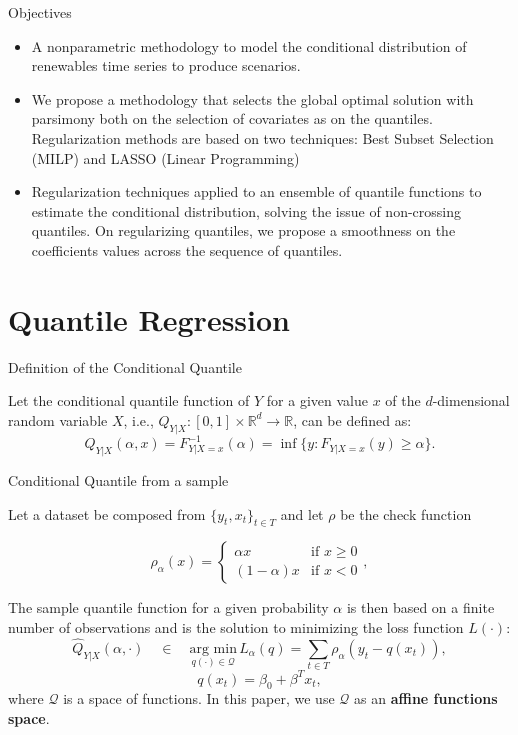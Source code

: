 \documentclass[11pt]{beamer}
\begin{document}
\begin{frame}{Objectives}

\begin{itemize}
\item A nonparametric methodology to model the conditional distribution of renewables time series to produce scenarios.

\item We propose a methodology that selects the global optimal solution with parsimony both on the selection of covariates as on the quantiles. Regularization methods are based on two techniques: Best Subset Selection (MILP) and LASSO (Linear Programming) 

\item Regularization techniques applied to an ensemble of quantile functions to estimate the conditional distribution, solving the issue of non-crossing quantiles. On regularizing quantiles, we propose a smoothness on the coefficients values across the sequence of quantiles. 

\end{itemize}

\end{frame}

\section{Quantile Regression}\label{quantile-regression}

\begin{frame}{Definition of the Conditional Quantile}

Let the conditional quantile function of \(Y\) for a given value \(x\)
of the \(d\)-dimensional random variable \(X\), i.e.,
\(Q_{Y|X}:[0,1] \times \mathbb{R}^d \rightarrow \mathbb{R}\), can be
defined as:
\[Q_{Y|X}(\alpha,x) = F_{Y|X=x}^{-1}(\alpha) = \inf\{y: F_{Y|X=x}(y) \geq \alpha\}.\]

\end{frame}

\begin{frame}{Conditional Quantile from a sample}

Let a dataset be composed from \(\{y_t,x_t \}_{t \in T}\) and let
\(\rho\) be the check function

\begin{equation}\label{eq:check-function}
\rho_{\alpha}(x)=\begin{cases}
\alpha x & \text{if }x\geq0\\
(1-\alpha)x & \text{if }x<0
\end{cases},
\end{equation}

The sample quantile function for a given probability \(\alpha\) is then
based on a finite number of observations and is the solution to
minimizing the loss function \(L(\cdot)\): \[
\hat{Q}_{Y|X}(\alpha,\cdot)\quad\in\quad  \underset{q(\cdot)\in\mathcal{Q}}{\text{arg min}}\, L_\alpha(q) = \sum_{t\in T}\rho_{\alpha}(y_{t}-q(x_t)), 
\] \[
q(x_t) = \beta_0 + \beta^T x_t,
\] where \(\mathcal{Q}\) is a space of functions. In this paper, we use
\(\mathcal{Q}\) as an \textbf{affine functions space}.

\end{frame}
\end{document}
